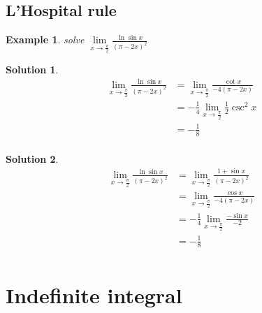\documentclass[a4paper,12pt]{report}
\newtheorem{example}{Example}[section]       %
\newtheorem*{solution}{Solution}    %
\begin{document}
\subsection{L'Hospital rule}
\begin{example}
    solve $\lim\limits_{x\rightarrow\frac{\pi}{2}}\displaystyle\frac{\ln\sin x}{(\pi-2x)^2}$ 
\end{example}
\begin{solution}
    $$\begin{aligned}
        \lim\limits_{x\rightarrow\frac{\pi}{2}}\displaystyle\frac{\ln\sin x}{(\pi-2x)^2}&=\lim\limits_{x\rightarrow\frac{\pi}{2}}{\displaystyle\frac{\cot x}{-4(\pi-2x)}}\\
        &=-\displaystyle\frac{1}{4}\lim\limits_{x\rightarrow\frac{\pi}{2}}{\displaystyle\frac{1}{2}\csc^2x}\\
        &=-\displaystyle\frac{1}{8}\\
    \end{aligned}$$
\end{solution}
\begin{solution}
    $$\begin{aligned}
        \lim\limits_{x\rightarrow\frac{\pi}{2}}\displaystyle\frac{\ln\sin x}{(\pi-2x)^2}&=\lim\limits_{x\rightarrow\frac{\pi}{2}}{\displaystyle\frac{1+\sin x}{(\pi-2x)^2}}\\
        &=\lim\limits_{x\rightarrow\frac{\pi}{2}}{\displaystyle\frac{\cos x}{-4(\pi-2x)}}\\
        &=-\displaystyle\frac{1}{4}\lim\limits_{x\rightarrow\frac{\pi}{2}}{\displaystyle\frac{-\sin x}{-2}}\\
        &=-\displaystyle\frac{1}{8}\\
    \end{aligned}$$
\end{solution}
\section{Indefinite integral}
\end{document}
